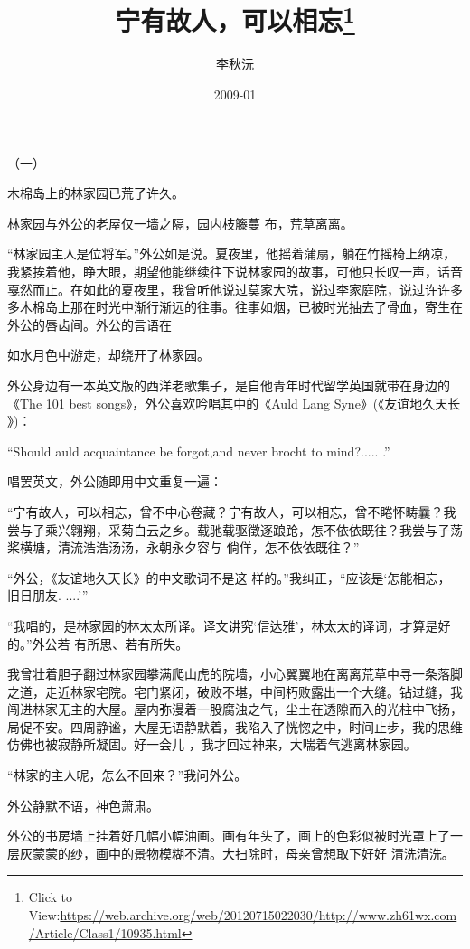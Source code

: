 \documentclass{article}
\title{宁有故人，可以相忘\footnote{Click to View:\url{https://web.archive.org/web/20120715022030/http://www.zh61wx.com/Article/Class1/10935.html}}}
\author{李秋沅}
\date{2009-01}
\begin{document}

\maketitle


\Large


﻿（一） 


木棉岛上的林家园已荒了许久。 

林家园与外公的老屋仅一墙之隔，园内枝籐蔓
布，荒草离离。 

“林家园主人是位将军。”外公如是说。夏夜里，他摇着蒲扇，躺在竹摇椅上纳凉，我紧挨着他，睁大眼，期望他能继续往下说林家园的故事，可他只长叹一声，话音戛然而止。在如此的夏夜里，我曾听他说过莫家大院，说过李家庭院，说过许许多多木棉岛上那在时光中渐行渐远的往事。往事如烟，已被时光抽去了骨血，寄生在外公的唇齿间。外公的言语在

\newpage
如水月色中游走，却绕开了林家园。 

外公身边有一本英文版的西洋老歌集子，是自他青年时代留学英国就带在身边的《The 101 best songs》，外公喜欢吟唱其中的《Auld Lang Syne》(《友谊地久天长
》)： 

“Should auld acquaintance be forgot,and never brocht to mind?.....
.” 


唱罢英文，外公随即用中文重复一遍： 

“宁有故人，可以相忘，曾不中心卷藏？宁有故人，可以相忘，曾不睠怀畴曩？我尝与子乘兴翱翔，采菊白云之乡。载驰载驱徵逐踉跄，怎不依依既往？我尝与子荡桨横塘，清流浩浩汤汤，永朝永夕容与
倘佯，怎不依依既往？” 

“外公，《友谊地久天长》的中文歌词不是这
\newpage
样的。”我纠正，“应该是‘怎能相忘，旧日朋友.
....’” 

“我唱的，是林家园的林太太所译。译文讲究‘信达雅’，林太太的译词，才算是好的。”外公若
有所思、若有所失。 

我曾壮着胆子翻过林家园攀满爬山虎的院墙，小心翼翼地在离离荒草中寻一条落脚之道，走近林家宅院。宅门紧闭，破败不堪，中间朽败露出一个大缝。钻过缝，我闯进林家无主的大屋。屋内弥漫着一股腐浊之气，尘土在透隙而入的光柱中飞扬，局促不安。四周静谧，大屋无语静默着，我陷入了恍惚之中，时间止步，我的思维仿佛也被寂静所凝固。好一会儿
，我才回过神来，大喘着气逃离林家园。 

“林家的主人呢，怎么不回来？”我问外公。
 


外公静默不语，神色萧肃。 

\newpage

外公的书房墙上挂着好几幅小幅油画。画有年头了，画上的色彩似被时光罩上了一层灰蒙蒙的纱，画中的景物模糊不清。大扫除时，母亲曾想取下好好
清洗清洗。 
\end{document}
